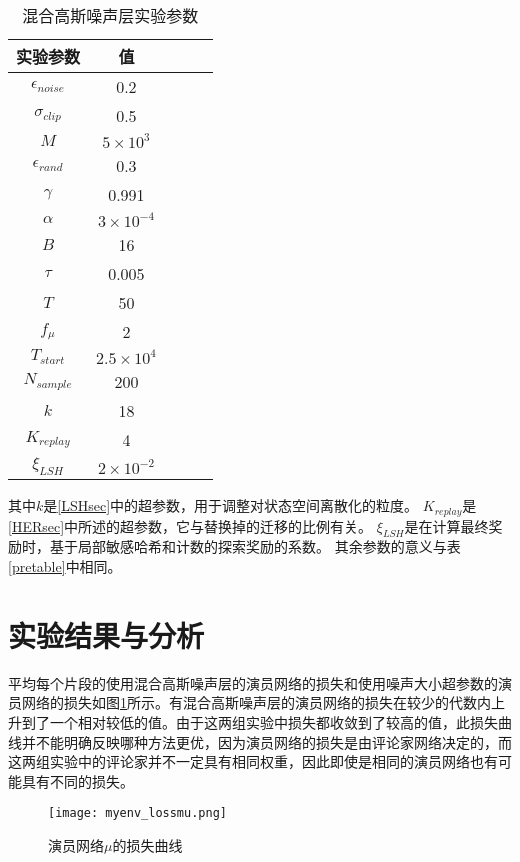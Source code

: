     \begin{table}[htbp]
        \caption{混合高斯噪声层实验参数}
        \label{fcntable}
    \vspace{0.5em}\centering\wuhao
    \begin{tabular}{ccccc}
    \toprule[1.5pt]
    实验参数 & 值\\
    \midrule[1pt]
        $\epsilon_{noise}$ & 0.2\\
        $\sigma_{clip}$ & 0.5\\
        $M$ & $5\times 10^3$\\
        $\epsilon_{rand}$ & 0.3\\
        $\gamma$ & 0.991\\
        $\alpha$ & $3\times 10^{-4}$\\
        $B$ & 16\\
        $\tau$ & 0.005\\
        $T$ & 50\\
        $f_\mu$ & 2\\
        $T_{start}$ & $2.5\times 10^4$\\
        $N_{sample}$ & 200 \\
        $k$ & 18\\
        $K_{replay}$ & 4\\
        $\xi_{LSH}$ & $2\times 10^{-2}$\\
    \bottomrule[1.5pt]
    \end{tabular}
    \end{table}
    其中$k$是\ref{LSHsec}中的超参数，用于调整对状态空间离散化的粒度。
    $K_{replay}$是\ref{HERsec}中所述的超参数，它与替换掉的迁移的比例有关。
    $\xi_{LSH}$是在计算最终奖励时，基于局部敏感哈希和计数的探索奖励的系数。
    其余参数的意义与表\ref{pretable}中相同。

\section{实验结果与分析}
    平均每个片段的使用混合高斯噪声层的演员网络的损失和使用噪声大小超参数的演员网络的损失如图\ref{fcn_lossmu}所示。有混合高斯噪声层的演员网络的损失在较少的代数内上升到了一个相对较低的值。由于这两组实验中损失都收敛到了较高的值，此损失曲线并不能明确反映哪种方法更优，因为演员网络的损失是由评论家网络决定的，而这两组实验中的评论家并不一定具有相同权重，因此即使是相同的演员网络也有可能具有不同的损失。

        \begin{figure}[htpb]
        \centering
        \texttt{[image: myenv\_lossmu.png]}
        \caption{演员网络$\mu$的损失曲线}
            \label{fcn_lossmu}
        \end{figure}

